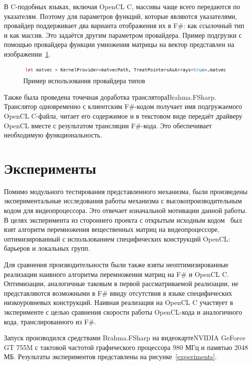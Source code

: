 \documentclass[14pt]{matmex-diploma}
\begin{document}
В C-подобных языках, включая OpenCL C, массивы чаще всего передаются по указателям. Поэтому для параметров функций, которые являются указателями, провайдер поддерживает два варианта отображения их в F\#: как ссылочный тип и как массив. Это задаётся другим параметром провайдера. Пример подгрузки с помощью провайдера функции умножения матрицы на вектор представлен на изображении~\ref{tp_call_example}.

\begin{figure}[h]
\centering
\includegraphics[width=15cm]{courseworkpictures/tp-call.png}
\caption{Пример использования провайдера типов}
\label{tp_call_example}
\end{figure}

Также была проведена точечная доработка транслятора\n Brahma.FSharp. Транслятор одновременно с клиентским F\#-кодом получает имя подгружаемого OpenCL C-файла, читает его содержимое и в текстовом виде передаёт драйверу OpenCL вместе с результатом трансляции F\#-кода. Это обеспечивает необходимую функциональность.

\section{Эксперименты}
Помимо модульного тестирования представленного механизма, были произведены экспериментальные исследования работы механизма с высокопроизводительным кодом для видеопроцессора. Это отвечает изначальной мотивации данной работы. В целях эксперимента из стороннего проекта с открытым исходным кодом~\cite{MyGEMM} был взят алгоритм перемножения вещественных матриц на видеопроцессоре, оптимизированный с использованием специфических конструкций OpenCL: барьеров и локальных групп.

Для сравнения производительности были также взяты неоптимизированные реализации наивного алгоритма перемножения матриц на F\# и OpenCL C. Оптимизации, аналогичные таковым в первой рассматриваемой реализации, не представляются возможными в F\# ввиду отсутствия в языке специфических низкоуровневых конструкций. Наивная реализация на OpenCL C участвует в эксперименте с целью сравнения скорости работы OpenCL-кода и аналогичного кода, транслированного из F\#.

Запуск производился средствами Brahma.FSharp на видеокарте\n NVIDIA GeForce GT 755M с тактовой частотой графического процессора 980 МГц и памятью 2048 МБ. Результаты экспериментов представлены на рисунке~\ref{experiments}.
\end{document}
